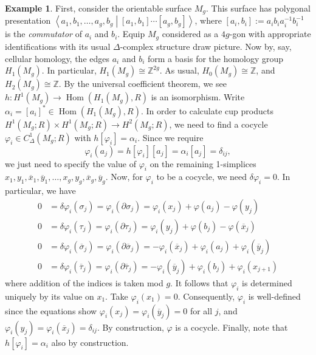 \documentclass{book}
\newcommand{\bbZ}{\mathbb{Z}}
\renewcommand{\phi}{\varphi}
\DeclareMathOperator{\Hom}{Hom}
\theoremstyle{definition}
\newtheorem{example}[theorem]{Example}
\theoremstyle{remark}
\numberwithin{equation}{section}
\begin{document}
\begin{example} \label{eg:orientableSurface}
    First, consider the orientable surface $M_g$. This surface has polygonal presentation $\left\langle a_1,b_1,\dots,a_g,b_g \middle\vert [a_1,b_1] \cdots [a_g,b_g] \right\rangle$, where $[a_i,b_i] := a_i b_i a_i^{-1} b_i^{-1}$ is the \textit{commutator} of $a_i$ and $b_i$. Equip $M_g$ considered as a $4g$-gon with appropriate identifications with its usual $\Delta$-complex structure {\color{red} draw picture}.
    Now by, say, cellular homology, the edges $a_i$ and $b_i$ form a basis for the homology group $H_1(M_g)$. In particular, $H_1(M_g) \cong \bbZ^{2g}$. As usual, $H_0(M_g) \cong \bbZ$, and $H_2(M_g) \cong \bbZ$. By the universal coefficient theorem, we see $h \colon H^1(M_g) \to \Hom(H_1(M_g),R)$ is an isomorphism. Write $\alpha_i = [a_i]^* \in \Hom(H_1(M_g),R)$. In order to calculate cup products $H^1(M_g;R) \times H^1(M_g;R) \to H^2(M_g;R)$, we need to find a cocycle $\phi_i \in C^1_\Delta(M_g;R)$ with $h[\phi_i] = \alpha_i$. Since we require
    \begin{equation}
        \phi_i(a_j) = h[\phi_i][a_j] = \alpha_i[a_j] = \delta_{ij},
    \end{equation}
    we just need to specify the value of $\phi_i$ on the remaining 1-simplices $x_1,y_1,\overline{x}_1,\overline{y}_1,\dots,x_g,y_g,\overline{x}_g,\overline{y}_g$. Now, for $\phi_i$ to be a cocycle, we need $\delta\phi_i = 0$. In particular, we have
    \begin{equation} \begin{aligned}
        0 &= \delta\phi_i(\sigma_j) = \phi_i(\partial \sigma_j) = \phi_i(x_j) + \phi(a_j) - \phi(y_j) \\
        0 &= \delta\phi_i(\tau_j)   = \phi_i(\partial\tau_j)    = \phi_i(y_j) + \phi(b_j) - \phi(\overline{x}_j) \\
        0 &= \delta\phi_i(\overline{\sigma}_j) = \phi_i(\partial\overline{\sigma}_j) = - \phi_i(\overline{x}_j) + \phi_i(a_j) + \phi_i(\overline{y}_j) \\
        0 &= \delta\phi_i(\overline{\tau}_j) = \phi_i(\partial\overline{\tau}_j) = - \phi_i(\overline{y}_j) + \phi_i(b_j) + \phi_i(x_{j+1})
    \end{aligned} \end{equation}
    where addition of the indices is taken mod $g$. It follows that $\phi_i$ is determined uniquely by its value on $x_1$. Take $\phi_i(x_1) = 0$. Consequently, $\phi_i$ is well-defined since the equations show $\phi_i(x_j) = \phi_i(\overline{y}_j) = 0$ for all $j$, and $\phi_i(y_j) = \phi_i(\overline{x}_j) =  \delta_{ij}$. By construction, $\phi$ is a cocycle. Finally, note that $h[\phi_i] = \alpha_i$ also by construction.


\end{example}
\end{document}
